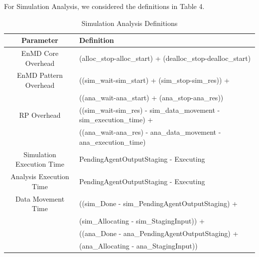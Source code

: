 \documentclass[]{article}
\begin{document}
		For Simulation Analysis, we considered the definitions in Table 4.

		\begin{table}[H]
			\centering
			\begin{tabular}{|c|p{10cm}|}
				\hline
				Parameter & Definition  \\
				\hline
				EnMD Core Overhead & (alloc\_stop-alloc\_start) +  (dealloc\_stop-dealloc\_start) \\
				\hline
				EnMD Pattern Overhead & ((sim\_wait-sim\_start) + (sim\_stop-sim\_res)) + \\ 
									  &	((ana\_wait-ana\_start) + (ana\_stop-ana\_res)) \\
				\hline
				RP Overhead & ((sim\_wait-sim\_res) - sim\_data\_movement - sim\_execution\_time) + \\
							&	((ana\_wait-ana\_res) - ana\_data\_movement - ana\_execution\_time) \\
				\hline
				Simulation Execution Time & PendingAgentOutputStaging - Executing \\
				\hline
				Analysis Execution Time & PendingAgentOutputStaging - Executing \\
				\hline
				Data Movement Time & ((sim\_Done - sim\_PendingAgentOutputStaging) + \\ 
								   &	(sim\_Allocating - sim\_StagingInput)) + \\
								   &	((ana\_Done - ana\_PendingAgentOutputStaging) + \\
								   &	(ana\_Allocating - ana\_StagingInput)) \\
				\hline
			\end{tabular}
			\caption{Simulation Analysis Definitions}
			\label{table:sa_definitions}
		\end{table}
\end{document}
